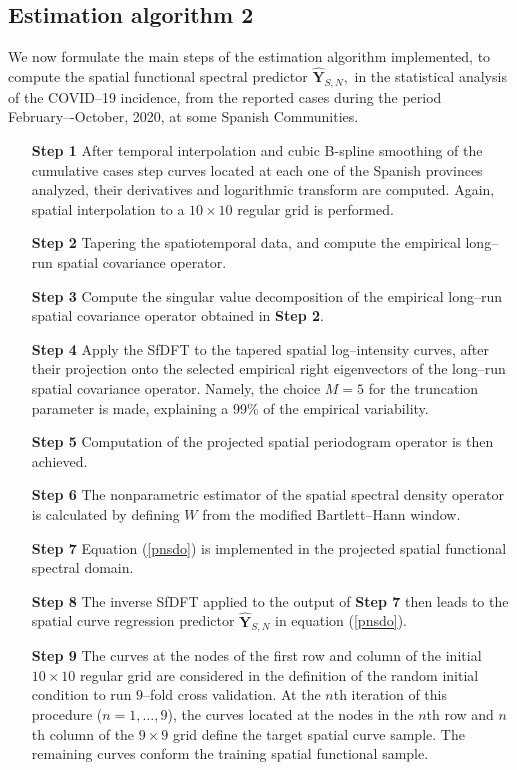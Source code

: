 \documentclass[11pt,a4paper]{article}
\begin{document}
\subsection{Estimation algorithm 2}
\label{ea2}
We now formulate the  main steps of the estimation algorithm implemented, to compute the spatial functional spectral predictor $\widehat{\mathbf{Y}}_{S,N},$ in the
statistical analysis  of  the COVID--19 incidence, from the  reported cases during the period February–-October, 2020,  at some  Spanish Communities.


\begin{itemize} \item[\textbf{Step 1}]  After temporal interpolation and cubic B-spline smoothing of the  cumulative cases step curves located at each one of the Spanish provinces analyzed, their derivatives and logarithmic transform are  computed. Again, spatial interpolation to a $10\times 10$ regular grid is performed.
\item[\textbf{Step 2}] Tapering the  spatiotemporal data, and compute  the empirical long--run spatial covariance operator.
\item[\textbf{Step 3}]  Compute the singular value decomposition  of the empirical  long--run spatial covariance operator obtained in \textbf{Step 2}.
\item[\textbf{Step 4}] Apply the SfDFT to the tapered spatial log--intensity   curves, after their projection onto the  selected empirical right eigenvectors of the long--run spatial covariance operator. Namely, the choice $M=5$ for the truncation parameter  is made,  explaining a 99\% of the empirical variability.
   \item[\textbf{Step 5}] Computation of the projected spatial periodogram operator is then achieved.
\item[\textbf{Step 6}]  The nonparametric estimator of the spatial spectral density operator is calculated by defining  $W$ from the modified  Bartlett--Hann window.
    \item[\textbf{Step 7}] Equation (\ref{pnsdo}) is implemented in the projected spatial functional spectral domain.
     \item[\textbf{Step 8}] The  inverse SfDFT applied to the output of \textbf{Step 7}
then leads to the spatial curve regression predictor $\widehat{\mathbf{Y}}_{S,N}$ in equation (\ref{pnsdo}).
          \item[\textbf{Step 9}] The curves at the nodes of the  first row and column of the initial $10\times 10$ regular grid are considered in the definition of the  random initial condition to run $9$--fold cross validation.
          At the $n$th iteration of this procedure ($n=1,\dots, 9$),    the curves located at the nodes in the $n$th row and $n$th column of the $9\times 9$  grid define the target spatial curve sample. The remaining curves conform the training spatial functional sample.

\end{itemize}
\end{document}
